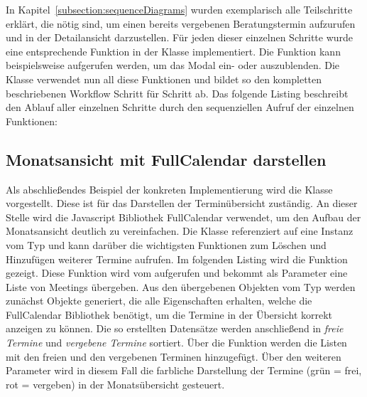 In Kapitel~\ref{subsection:sequenceDiagrams} wurden exemplarisch alle
Teilschritte erklärt, die nötig sind, um einen bereits vergebenen
Beratungstermin aufzurufen und in der Detailansicht darzustellen. Für jeden
dieser einzelnen Schritte wurde eine entsprechende Funktion in der Klasse
 implementiert. Die Funktion
 kann beispielsweise aufgerufen werden, um das
Modal ein- oder auszublenden. Die Klasse  verwendet
nun all diese Funktionen und bildet so den kompletten beschriebenen Workflow
Schritt für Schritt ab. Das folgende Listing beschreibt den Ablauf aller
einzelnen Schritte durch den sequenziellen Aufruf der einzelnen Funktionen:






\subsection*{Monatsansicht mit FullCalendar darstellen}

Als abschließendes Beispiel der konkreten Implementierung wird die Klasse
 vorgestellt. Diese ist für das Darstellen der
Terminübersicht zuständig. An dieser Stelle wird die Javascript Bibliothek
\gls{FullCalendar} verwendet, um den Aufbau der Monatsansicht deutlich zu vereinfachen. Die Klasse 
referenziert auf eine Instanz vom Typ  und kann darüber die
wichtigsten Funktionen zum Löschen und Hinzufügen weiterer Termine aufrufen. Im
folgenden Listing wird die Funktion  gezeigt.
Diese Funktion wird vom  aufgerufen und bekommt als
Parameter eine Liste von Meetings übergeben. Aus den übergebenen Objekten vom
Typ  werden zunächst Objekte generiert, die alle Eigenschaften
erhalten, welche die FullCalendar Bibliothek benötigt, um die Termine
in der Übersicht korrekt anzeigen zu können. Die so erstellten Datensätze
werden anschließend in \textit{freie Termine} und \textit{vergebene Termine}
sortiert. Über die Funktion 
werden die Listen mit den freien und den vergebenen Terminen hinzugefügt. Über
den weiteren Parameter  wird in diesem Fall die farbliche
Darstellung der Termine (grün = frei, rot = vergeben) in der Monatsübersicht gesteuert.

